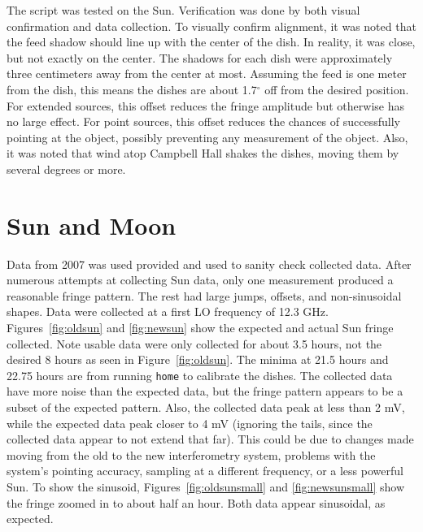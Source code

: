 \documentclass[12pt]{article}
\newcommand{\degree}{\ensuremath{^\circ} }
\begin{document}
The script was tested on the Sun.
Verification was done by both visual confirmation and data collection.
To visually confirm alignment, it was noted that the feed shadow should line up with the center of the dish.
In reality, it was close, but not exactly on the center.
The shadows for each dish were approximately three centimeters away from the center at most.
Assuming the feed is one meter from the dish, this means the dishes are about 1.7\degree off from the desired position.
For extended sources, this offset reduces the fringe amplitude but otherwise has no large effect.
For point sources, this offset reduces the chances of successfully pointing at the object, possibly preventing any measurement of the object.
Also, it was noted that wind atop Campbell Hall shakes the dishes, moving them by several degrees or more.

\section{Sun and Moon}

Data from 2007 was used provided and used to sanity check collected data.
After numerous attempts at collecting Sun data, only one measurement produced a reasonable fringe pattern.
The rest had large jumps, offsets, and non-sinusoidal shapes.
Data were collected at a first LO frequency of 12.3 GHz.
Figures~\ref{fig:oldsun} and \ref{fig:newsun} show the expected and actual Sun fringe collected.
Note usable data were only collected for about 3.5 hours, not the desired 8 hours as seen in Figure~\ref{fig:oldsun}.
The minima at 21.5 hours and 22.75 hours are from running \texttt{home} to calibrate the dishes.
The collected data have more noise than the expected data, but the fringe pattern appears to be a subset of the expected pattern.
Also, the collected data peak at less than 2 mV, while the expected data peak closer to 4 mV (ignoring the tails, since the collected data appear to not extend that far).
This could be due to changes made moving from the old to the new interferometry system, problems with the system's pointing accuracy, sampling at a different frequency, or a less powerful Sun.
To show the sinusoid, Figures~\ref{fig:oldsunsmall} and \ref{fig:newsunsmall} show the fringe zoomed in to about half an hour.
Both data appear sinusoidal, as expected.
\end{document}
